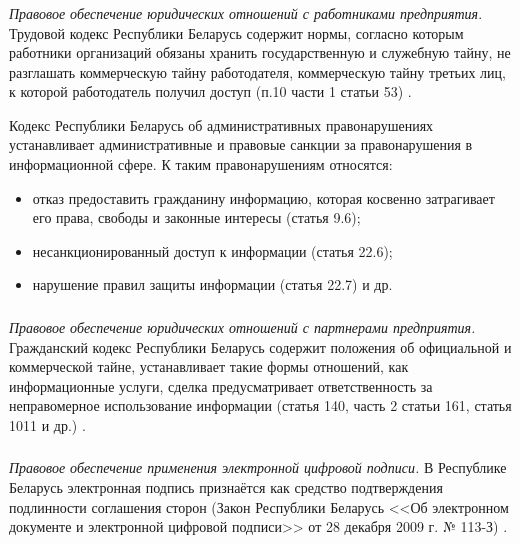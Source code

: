 \subsubsection{}
\label{subsubsec:measures:law:employees}
\textit{Правовое обеспечение юридических отношений с работниками предприятия}.
Трудовой кодекс Республики Беларусь содержит нормы, согласно которым работники организаций
обязаны хранить государственную и служебную тайну, не разглашать
коммерческую тайну работодателя, коммерческую тайну третьих лиц, к
которой работодатель получил доступ (п.10 части 1 статьи 53) \cite{labor_kodeks}.

Кодекс Республики Беларусь об административных правонарушениях устанавливает административные и правовые санкции за правонарушения в информационной сфере.
К таким правонарушениям относятся:
\begin{itemize}
	\item отказ предоставить гражданину информацию, которая косвенно затрагивает его
права, свободы и законные интересы (статья 9.6);
	\item несанкционированный доступ к информации (статья 22.6);
	\item нарушение правил защиты информации (статья 22.7) и др. \cite{koap_rb}
\end{itemize}

\subsubsection{}
\label{subsubsec:measures:law:partners}

\textit{Правовое обеспечение юридических отношений с партнерами предприятия.}
Гражданский кодекс Республики Беларусь содержит положения об
официальной и коммерческой тайне, устанавливает такие формы отношений,
как информационные услуги,  сделка предусматривает ответственность
за неправомерное использование информации (статья 140, часть 2 статьи 161,
статья 1011 и др.) \cite{civil_kodeks}.

\subsubsection{}
\label{subsubsec:measures:law:digital_signature}

\textit{Правовое обеспечение применения электронной цифровой подписи.}
В Республике Беларусь электронная подпись признаётся как средство подтверждения подлинности соглашения сторон (Закон Республики Беларусь <<Об электронном документе и электронной цифровой подписи>> от 28 декабря 2009 г. № 113-З) \cite{law_ecp}.
